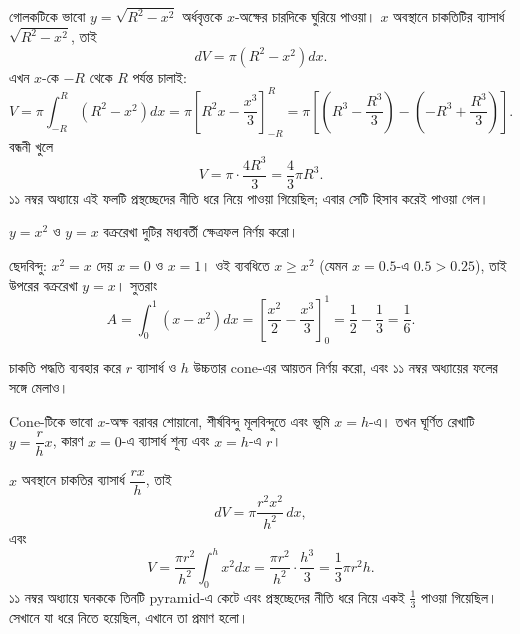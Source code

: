 \documentclass[11pt]{article}
\begin{document}
\begin{solbox}
\begin{center}
\end{center}

গোলকটিকে ভাবো $y = \sqrt{R^{2}-x^{2}}$ অর্ধবৃত্তকে $x$-অক্ষের চারদিকে ঘুরিয়ে
পাওয়া। $x$ অবস্থানে চাকতিটির ব্যাসার্ধ $\sqrt{R^{2}-x^{2}}$, তাই
\[
  dV = \pi\left( R^{2}-x^{2} \right)dx .
\]
এখন $x$-কে $-R$ থেকে $R$ পর্যন্ত চালাই:
\[
  V = \pi\int_{-R}^{R}\left( R^{2}-x^{2} \right)dx
    = \pi\left[ R^{2}x - \frac{x^{3}}{3} \right]_{-R}^{R}
    = \pi\left[ \left( R^{3}-\frac{R^{3}}{3} \right)
      - \left( -R^{3}+\frac{R^{3}}{3} \right) \right] .
\]
বন্ধনী খুলে
\[
  V = \pi \cdot \frac{4R^{3}}{3} = \frac{4}{3}\pi R^{3} .
\]
১১ নম্বর অধ্যায়ে এই ফলটি প্রস্থচ্ছেদের নীতি ধরে নিয়ে পাওয়া গিয়েছিল; এবার
সেটি হিসাব করেই পাওয়া গেল।
\end{solbox}

 $y = x^{2}$ ও $y = x$ বক্ররেখা দুটির মধ্যবর্তী ক্ষেত্রফল নির্ণয় করো।

\begin{sol}
ছেদবিন্দু: $x^{2} = x$ দেয় $x = 0$ ও $x = 1$। ওই ব্যবধিতে $x \geq x^{2}$
(যেমন $x = 0.5$-এ $0.5 > 0.25$), তাই উপরের বক্ররেখা $y = x$। সুতরাং
\[
  A = \int_{0}^{1}\left( x - x^{2} \right)dx
    = \left[ \frac{x^{2}}{2} - \frac{x^{3}}{3} \right]_{0}^{1}
    = \frac{1}{2} - \frac{1}{3} = \frac{1}{6} .
\]
\end{sol}

 চাকতি পদ্ধতি ব্যবহার করে $r$ ব্যাসার্ধ ও $h$ উচ্চতার cone-এর আয়তন
নির্ণয় করো, এবং ১১ নম্বর অধ্যায়ের ফলের সঙ্গে মেলাও।

\begin{sol}
Cone-টিকে ভাবো $x$-অক্ষ বরাবর শোয়ানো, শীর্ষবিন্দু মূলবিন্দুতে এবং ভূমি
$x = h$-এ। তখন ঘূর্ণিত রেখাটি $y = \dfrac{r}{h}x$, কারণ $x=0$-এ ব্যাসার্ধ শূন্য
এবং $x=h$-এ $r$।

$x$ অবস্থানে চাকতির ব্যাসার্ধ $\dfrac{rx}{h}$, তাই
\[
  dV = \pi\frac{r^{2}x^{2}}{h^{2}}\,dx ,
\]
এবং
\[
  V = \frac{\pi r^{2}}{h^{2}}\int_{0}^{h}x^{2}dx
    = \frac{\pi r^{2}}{h^{2}} \cdot \frac{h^{3}}{3}
    = \frac{1}{3}\pi r^{2}h .
\]
১১ নম্বর অধ্যায়ে ঘনককে তিনটি pyramid-এ কেটে এবং প্রস্থচ্ছেদের নীতি ধরে
নিয়ে একই $\tfrac{1}{3}$ পাওয়া গিয়েছিল। সেখানে যা ধরে নিতে হয়েছিল, এখানে
তা প্রমাণ হলো।
\end{sol}
\end{document}
